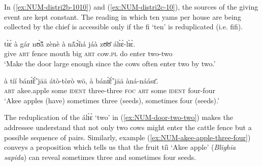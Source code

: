 \begin{exe}
\begin{exe}
\begin{exe}
\begin{exe}
\begin{exe}
\begin{exe}
\begin{exe}
\begin{exe}
\begin{exe}
\begin{exe}
In (\ref{ex:NUM-distri2b-1010}) and (\ref{ex:NUM-distri2c-10}), the sources of
the giving event are kept constant. The reading in which
ten yams per house are being collected by the chief is accessible only
if the  {\sls fi}  `ten' is reduplicated (i.e.  {\sls fifi}).

\ea
\ea\label{ex:NUM-door-two-two}

 \gll  tɪ̀ɛ̀  à gár  nʊ̃́ã́ zènè  à nã́ɔ̃́ná  jáà  zʊ̄ʊ̄  álɪ̀ɛ̀-lɪ̀ɛ̀.\\
  {give}   \textsc{art}  {fence}  {mouth}   {big}  \textsc{art} 
{cow.\textsc{pl}}   {do} {enter} {two-two}\\
\glt  `Make the door large enough since the cows often enter two by two.'\\


\ex\label{ex:NUM-akee-apple-three-four}

 \gll  à tíí bánɪ̃́ɛ̃́ jāā  átò-tòrò  wō, à  bánɪ̃́ɛ̃́ jāā  àná-náásɛ̄.\\
 \textsc{art}  {akee.apple}  {some} \textsc{ident}   {three-three}  \textsc{foc}   \textsc{art}   {some}   
\textsc{ident} {four-four}\\
\glt  `Akee apples (have) sometimes  three (seeds), sometimes four (seeds).'\\

\z
\z


 



The reduplication of the  {\sls álɪ̀ɛ̀} `two' in
(\ref{ex:NUM-door-two-two})
makes the
addressee understand that not only two cows might enter the cattle fence but a
possible sequence of  pairs. Similarly,   example 
(\ref{ex:NUM-akee-apple-three-four}) conveys a proposition which tells us that
the
fruit  {\sls tíì}  `Akee apple' (\textit{Blighia sapida}) can reveal sometimes
three
and sometimes
four seeds.







\end{exe}
\end{exe}
\end{exe}
\end{exe}
\end{exe}
\end{exe}
\end{exe}
\end{exe}
\end{exe}
\end{exe}
